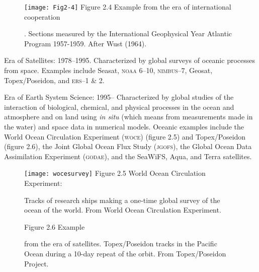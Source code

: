 \begin{enumerate}
\begin{figure}[t!]
\texttt{[image: Fig2-4]}
\centering
\footnotesize
Figure 2.4 Example from the era of international cooperation
\rule{0pt}{3ex}. Sections measured by the International Geophysical
Year Atlantic Program 1957-1959. After Wust (1964).

\label{fig:Fig2-4}
\vspace{-3ex}
\end{figure}

\vitem Era of Satellites: 1978--1995. Characterized by global surveys
of oceanic processes from space. Examples include Seasat,
\textsc{noaa} 6--10, \textsc{nimbus}--7, Geosat,
Topex/\-Poseidon, and \textsc{ers}--1 \&
2.

\vitem Era of Earth System Science: 1995-- Characterized by global
studies of the interaction of biological, chemical, and physical
processes in the ocean and atmosphere and on land using \textit{in
  situ}  (which means from measurements made in
the water) and space data in numerical models. Oceanic examples
include the World Ocean Circulation Experiment
(\textsc{woce}) (figure 2.5)
and Topex/Poseidon (figure 2.6), the Joint Global Ocean Flux Study
 (\textsc{jgofs}), the
Global Ocean Data Assimilation Experiment (\textsc {godae}), and the
SeaWiFS, Aqua, and Terra satellites.
\end{enumerate}

\begin{figure}[t!]
\texttt{[image: wocesurvey]}
\centering
\footnotesize
Figure 2.5 World Ocean
Circulation Experiment:\rule{0pt}{4ex} Tracks of research ships making
a one-time global survey of the ocean of the world. From World Ocean
Circulation Experiment.

\label{fig:wocesurvey}
\vspace{-3ex}
\end{figure}

\begin{figure}[b!]
\vspace{-1ex}
\centering
\footnotesize
Figure 2.6 Example \rule{0mm}{3ex}from the era of satellites.
Topex/Poseidon tracks in the
Pacific\\Ocean during a 10-day repeat of the orbit. From
Topex/Poseidon Project.

\label{fig:Fig2-6}
\end{figure}

